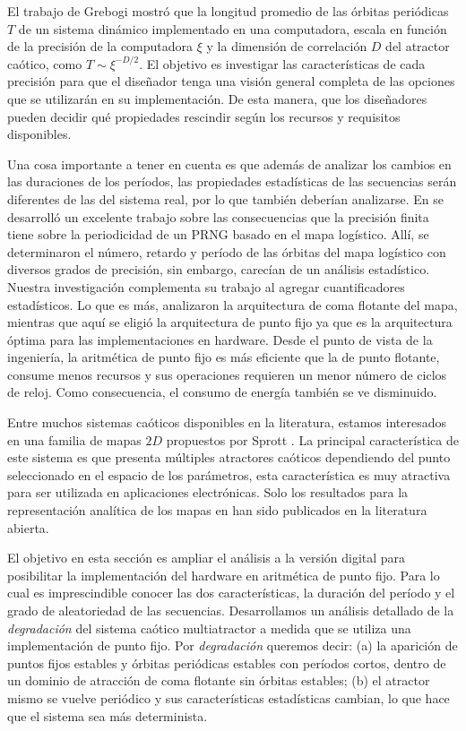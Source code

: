 El trabajo de Grebogi \cite{Grebogi1988} mostró que la longitud promedio de las órbitas periódicas $T$ de un sistema dinámico implementado en una computadora, escala en función de la precisión de la computadora $\xi$ y la dimensión de correlación $D$ del atractor caótico, como $T \sim \xi ^ {- D / 2}$.
El objetivo es investigar las características de cada precisión para que el diseñador tenga una visión general completa de las opciones que se utilizarán en su implementación.
De esta manera, que los diseñadores pueden decidir qué propiedades rescindir según los recursos y requisitos disponibles.

Una cosa importante a tener en cuenta es que además de analizar los cambios en las duraciones de los períodos, las propiedades estadísticas de las secuencias serán diferentes de las del sistema real, por lo que también deberían analizarse.
En \cite{Persohn2012} se desarrolló un excelente trabajo sobre las consecuencias que la precisión finita tiene sobre la periodicidad de un PRNG basado en el mapa logístico.
Allí, se determinaron el número, retardo y período de las órbitas del mapa logístico con diversos grados de precisión, sin embargo, carecían de un análisis estadístico.
Nuestra investigación complementa su trabajo al agregar cuantificadores estadísticos.
Lo que es más, analizaron la arquitectura de coma flotante del mapa, mientras que aquí se eligió la arquitectura de punto fijo ya que es la arquitectura óptima para las implementaciones en hardware.
Desde el punto de vista de la ingeniería, la aritmética de punto fijo es más eficiente que la de punto flotante, consume menos recursos y sus operaciones requieren un menor número de ciclos de reloj.
Como consecuencia, el consumo de energía también se ve disminuido.

Entre muchos sistemas caóticos disponibles en la literatura, estamos interesados en una familia de mapas $2D$ propuestos por Sprott \cite{Sprott1993}.
La principal característica de este sistema es que presenta múltiples atractores caóticos dependiendo del punto seleccionado en el espacio de los parámetros, esta característica es muy atractiva para ser utilizada en aplicaciones electrónicas.
Solo los resultados para la representación analítica de los mapas en \cite{Sprott1993} han sido publicados en la literatura abierta.

El objetivo en esta sección es ampliar el análisis a la versión digital para posibilitar la implementación del hardware en aritmética de punto fijo.
Para lo cual es imprescindible conocer las dos características, la duración del período y el grado de aleatoriedad de las secuencias.
Desarrollamos un análisis detallado de la \textsl{degradación} del sistema caótico multiatractor a medida que se utiliza una implementación de punto fijo.
Por \textsl{degradación} queremos decir:
(a) la aparición de puntos fijos estables y órbitas periódicas estables con períodos cortos, dentro de un dominio de atracción de coma flotante sin órbitas estables;
(b) el atractor mismo se vuelve periódico y sus características estadísticas cambian, lo que hace que el sistema sea más determinista.

